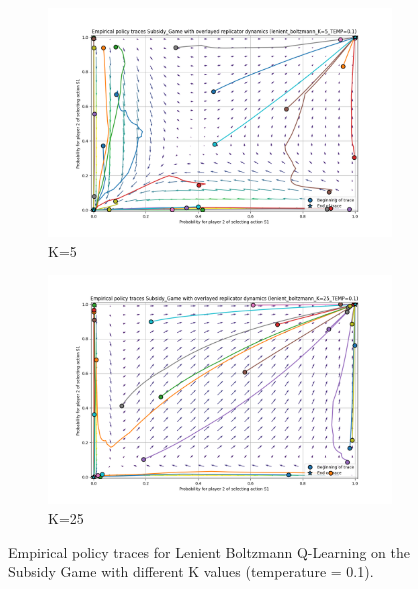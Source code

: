 \documentclass[12pt,a4paper, onecolumn]{exam}
\begin{document}
\begin{appendices}
\begin{figure}[H]
\begin{subfigure}{0.44\textwidth}
        \end{subfigure}
        \vspace{0.5cm}
        \begin{subfigure}{0.44\textwidth}
            \centering
            \includegraphics[width=\linewidth]{plots/replicator_trajectoreis_Subsidy_Game_lenient_boltzmann_K=5_TEMP=0.1.png}
            \caption{K=5}
        \end{subfigure}
        \hfill
        \begin{subfigure}{0.44\textwidth}
            \centering
            \includegraphics[width=\linewidth]{plots/replicator_trajectoreis_Subsidy_Game_lenient_boltzmann_K=25_TEMP=0.1.png}
            \caption{K=25}
        \end{subfigure}
        \caption{Empirical policy traces for Lenient Boltzmann Q-Learning on the Subsidy Game with different K values (temperature = 0.1).}
        \label{fig:app_subsidy_k_values}
    \end{figure}


\end{appendices}
\end{document}
